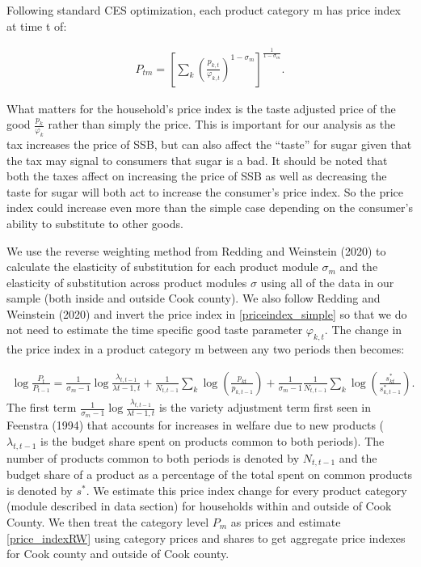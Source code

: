 \documentclass[12pt]{article}
\begin{document}
Following standard CES optimization, each product category m has price index at time t of:

\begin{align}
    P_{tm} = \left[ \sum_k \left( \frac{p_{k,t}}{\varphi_{k,t}}  \right)^{1-\sigma_m}  \right]^{\frac{1}{1-\sigma_m}}. \label{priceindex_simple}
\end{align}

What matters for the household's price index is the taste adjusted price of the good $\frac{p_k}{\varphi_k}$ rather than simply the price. This is important for our analysis as the tax increases the price of SSB, but can also affect the ``taste'' for sugar given that the tax may signal to consumers that sugar is a bad. It should be noted that both the taxes affect on increasing the price of SSB as well as decreasing the taste for sugar will both act to increase the consumer's price index. So the price index could increase even more than the simple case depending on the consumer's ability to substitute to other goods.

We use the reverse weighting method from Redding and Weinstein (2020) to calculate the elasticity of substitution for each product module $\sigma_m$  and the elasticity of substitution across product modules $\sigma$ using all of the data in our sample (both inside and outside Cook county). We also follow Redding and Weinstein (2020) and invert the price index in \eqref{priceindex_simple} so that we do not need to estimate the time specific good taste parameter $\varphi_{k,t}$. The change in the price index in a product category m between any two periods then becomes:

\begin{align}
    \log \frac{P_t}{P_{t-1}} = \frac{1  }{\sigma_m-1} \log \frac{\lambda_{t,t-1}}{\lambda{t-1,t}} + \frac{1}{N_{t,t-1}} \sum_k \log \left(  \frac{p_{kt}}{p_{k,t-1}}\right) + \frac{1}{\sigma_m -1}\frac{1}{N_{t,t-1}} \sum_k \log\left(\frac{s^*_{kt}}{s^*_{k,t-1}} \right) \label{price_indexRW} .
\end{align}
The first term $\frac{1  }{\sigma_m-1} \log \frac{\lambda_{t,t-1}}{\lambda{t-1,t}}$ is the variety adjustment term first seen in Feenstra (1994) that accounts for increases in welfare due to new products ($\lambda_{t,t-1}$ is the budget share spent on products common to both periods). The number of products common to both periods is denoted by $N_{t,t-1}$ and the budget share of a product as a percentage of the total spent on common products is denoted by $s^*$. We estimate this price index change for every product category (module described in data section) for households within and outside of Cook County. We then treat the category level $P_m$ as prices and estimate \eqref{price_indexRW} using category prices and shares to get aggregate price indexes for Cook county and outside of Cook county.
\end{document}
